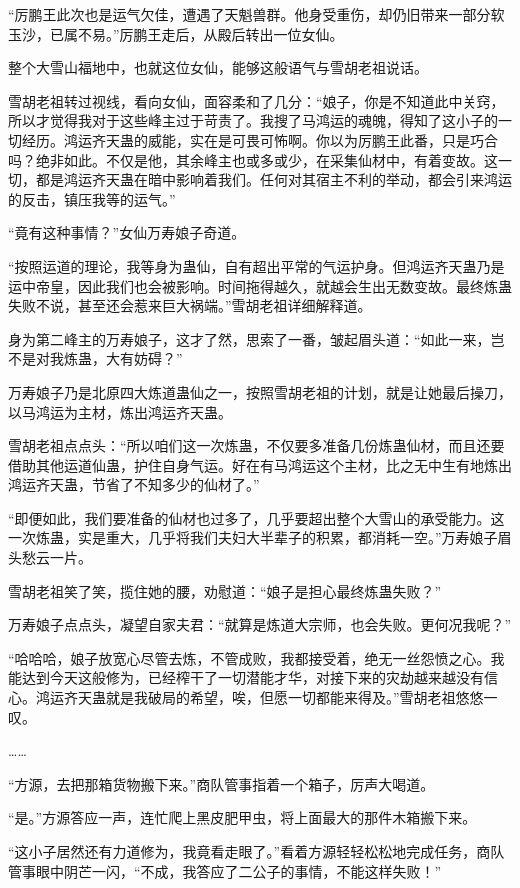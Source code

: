 \begin{this_body}
“厉鹏王此次也是运气欠佳，遭遇了天魁兽群。他身受重伤，却仍旧带来一部分软玉沙，已属不易。”厉鹏王走后，从殿后转出一位女仙。

整个大雪山福地中，也就这位女仙，能够这般语气与雪胡老祖说话。

雪胡老祖转过视线，看向女仙，面容柔和了几分：“娘子，你是不知道此中关窍，所以才觉得我对于这些峰主过于苛责了。我搜了马鸿运的魂魄，得知了这小子的一切经历。鸿运齐天蛊的威能，实在是可畏可怖啊。你以为厉鹏王此番，只是巧合吗？绝非如此。不仅是他，其余峰主也或多或少，在采集仙材中，有着变故。这一切，都是鸿运齐天蛊在暗中影响着我们。任何对其宿主不利的举动，都会引来鸿运的反击，镇压我等的运气。”

“竟有这种事情？”女仙万寿娘子奇道。

“按照运道的理论，我等身为蛊仙，自有超出平常的气运护身。但鸿运齐天蛊乃是运中帝皇，因此我们也会被影响。时间拖得越久，就越会生出无数变故。最终炼蛊失败不说，甚至还会惹来巨大祸端。”雪胡老祖详细解释道。

身为第二峰主的万寿娘子，这才了然，思索了一番，皱起眉头道：“如此一来，岂不是对我炼蛊，大有妨碍？”

万寿娘子乃是北原四大炼道蛊仙之一，按照雪胡老祖的计划，就是让她最后操刀，以马鸿运为主材，炼出鸿运齐天蛊。

雪胡老祖点点头：“所以咱们这一次炼蛊，不仅要多准备几份炼蛊仙材，而且还要借助其他运道仙蛊，护住自身气运。好在有马鸿运这个主材，比之无中生有地炼出鸿运齐天蛊，节省了不知多少的仙材了。”

“即便如此，我们要准备的仙材也过多了，几乎要超出整个大雪山的承受能力。这一次炼蛊，实是重大，几乎将我们夫妇大半辈子的积累，都消耗一空。”万寿娘子眉头愁云一片。

雪胡老祖笑了笑，揽住她的腰，劝慰道：“娘子是担心最终炼蛊失败？”

万寿娘子点点头，凝望自家夫君：“就算是炼道大宗师，也会失败。更何况我呢？”

“哈哈哈，娘子放宽心尽管去炼，不管成败，我都接受着，绝无一丝怨愤之心。我能达到今天这般修为，已经榨干了一切潜能才华，对接下来的灾劫越来越没有信心。鸿运齐天蛊就是我破局的希望，唉，但愿一切都能来得及。”雪胡老祖悠悠一叹。

……

“方源，去把那箱货物搬下来。”商队管事指着一个箱子，厉声大喝道。

“是。”方源答应一声，连忙爬上黑皮肥甲虫，将上面最大的那件木箱搬下来。

“这小子居然还有力道修为，我竟看走眼了。”看着方源轻轻松松地完成任务，商队管事眼中阴芒一闪，“不成，我答应了二公子的事情，不能这样失败！”


\end{this_body}
